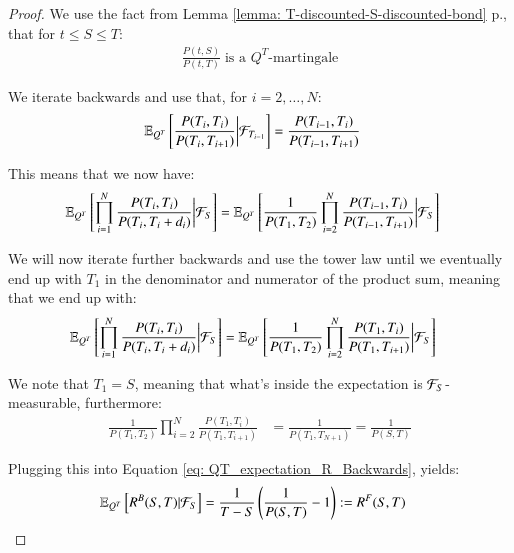 \begin{proof}
We use the fact from Lemma \ref{lemma: T-discounted-S-discounted-bond} p.\pageref{lemma: T-discounted-S-discounted-bond}, that for $t\leq S \leq T$:
\begin{align*}
\frac{P(t,S)}{P(t,T)}\;\text{is a $Q^{T}$-martingale}    
\end{align*}

\newpage 

We iterate backwards and use that, for $i = 2, \dots, N$: 
\begin{align*}
\mathbb{E}_{Q^{T}}\left[
\frac{P(T_{i}, T_{i})}{P(T_{i}, T_{i+1})}
\bigg{|}\mathcal{F}_{T_{i-1}}\right] 
&= 
\frac{P(T_{i-1}, T_{i})}{P(T_{i-1}, T_{i+1})}
\end{align*}

This means that we now have: 
\begin{align*}
\mathbb{E}_{Q^{T}}\left[
\prod_{i=1}^{N}\frac{
P(T_{i}, T_{i})
}{
P(T_{i}, T_{i} + d_{i})
}
\bigg{|}\mathcal{F}_{S}
\right]
&= 
\mathbb{E}_{Q^{T}}\left[
\frac{1}{P(T_{1}, T_{2})}\prod_{i=2}^{N}\frac{P(T_{i-1}, T_{i})}{P(T_{i-1}, T_{i+1})}
\bigg{|}\mathcal{F}_{S}\right]
\end{align*}

We will now iterate further backwards and use the tower law until we eventually end up with $T_{1}$ in the 
denominator and numerator of the product sum, meaning that we end up with: 
\begin{align*}
\mathbb{E}_{Q^{T}}\left[
\prod_{i=1}^{N}\frac{
P(T_{i}, T_{i})
}{
P(T_{i}, T_{i} + d_{i})
}
\bigg{|}\mathcal{F}_{S}
\right]
&= 
\mathbb{E}_{Q^{T}}\left[
\frac{1}{P(T_{1}, T_{2})}
\prod_{i=2}^{N}\frac{P(T_{1}, T_{i})}{P(T_{1}, T_{i+1})}
\bigg{|}\mathcal{F}_{S}\right]
\end{align*}

We note that $T_{1} = S$, meaning that what's inside the expectation is $\mathcal{F}_{S}$-measurable, furthermore: 
\begin{align*}
\frac{1}{P(T_{1}, T_{2})}\prod_{i=2}^{N}\frac{P(T_{1}, T_{i})}{P(T_{1}, T_{i+1})}
&= 
\frac{1}{P(T_{1}, T_{N+1})} = \frac{1}{P(S,T)}
\end{align*}

Plugging this into Equation \ref{eq: QT_expectation_R_Backwards}, yields: 
\begin{align*}
\mathbb{E}_{Q^{T}}\left[
R^{B}(S,T)|\mathcal{F}_{S}
\right] 
&= 
\frac{1}{T-S}
\left(
\frac{1}{P(S,T)} - 1
\right) := R^{F}(S,T)
\end{align*}

\end{proof}


\newpage 

